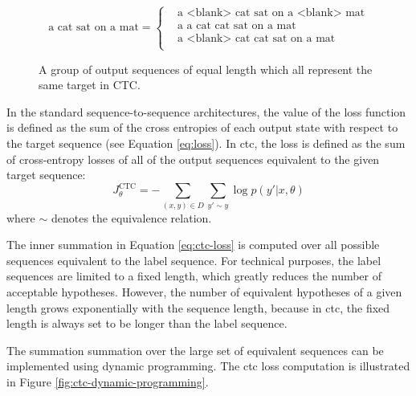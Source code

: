 \begin{figure}
  \centering
  \begin{minipage}{\textwidth}
    \begin{equation*}
        \text{a cat sat on a mat} =
        \begin{cases}
          & \text{a <blank> cat sat on a <blank> mat} \\
          & \text{a a cat cat sat on a mat} \\
          & \text{a <blank> cat cat sat on a mat} \\
        \end{cases}
    \end{equation*}
  \end{minipage}
  \caption{A group of output sequences of equal length which all represent the
    same target in CTC.} %
  \label{fig:ctc-equivalent-sequences}
\end{figure}

In the standard sequence-to-sequence architectures, the value of the loss
function is defined as the sum of the cross entropies of each output state with
respect to the target sequence (see Equation \ref{eq:loss}). In \gls{ctc}, the
loss is defined as the sum of cross-entropy losses of all of the output
sequences equivalent to the given target sequence:
%
\begin{equation}
  J_{\theta}^{\text{CTC}} = - \sum_{(x, y) \in D} \sum_{y' \sim y}  \log p(y' | x, \theta)
  \label{eq:ctc-loss}
\end{equation}
%
where $\sim$ denotes the equivalence relation.  

The inner summation in Equation \ref{eq:ctc-loss} is computed over all possible
sequences equivalent to the label sequence. For technical purposes, the label
sequences are limited to a fixed length, which greatly reduces the number of
acceptable hypotheses. However, the number of equivalent hypotheses of a given
length grows exponentially with the sequence length, because in \gls{ctc}, the
fixed length is always set to be longer than the label sequence.

The summation summation over the large set of equivalent sequences can be
implemented using dynamic programming.   The
\gls{ctc} loss computation is illustrated in Figure
\ref{fig:ctc-dynamic-programming}.


